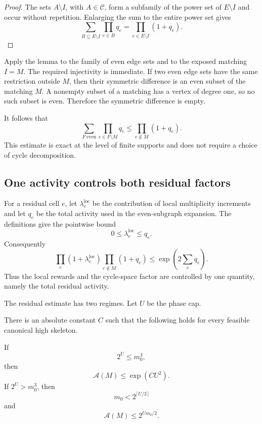 \begin{proof}
The sets $A\setminus I$, with $A\in\mathcal C$, form a subfamily of the power
set of $E\setminus I$ and occur without repetition.  Enlarging the sum to the
entire power set gives
\[
  \sum_{B\subseteq E\setminus I}\prod_{e\in B}q_e
  =
  \prod_{e\in E\setminus I}(1+q_e).
\]
\end{proof}

Apply the lemma to the family of even edge sets and to the exposed matching
$I=M$.  The required injectivity is immediate.  If two even edge sets have the
same restriction outside $M$, then their symmetric difference is an even
subset of the matching $M$.  A nonempty subset of a matching has a vertex of
degree one, so no such subset is even.  Therefore the symmetric difference is
empty.

It follows that
\begin{equation}
  \sum_{F\ \mathrm{even}}
    \prod_{e\in F\setminus M}q_e
  \le
  \prod_{e\notin M}(1+q_e).
  \label{eq:even-family-product-v2}
\end{equation}
This estimate is exact at the level of finite supports and does not require a
choice of cycle decomposition.

\subsection{One activity controls both residual factors}

For a residual cell $e$, let $\lambda_e^{\mathrm{loc}}$ be the contribution of
local multiplicity increments and let $q_e$ be the total activity used in the
even-subgraph expansion.  The definitions give the pointwise bound
\[
  0\le \lambda_e^{\mathrm{loc}}\le q_e.
\]
Consequently
\[
  \prod_e(1+\lambda_e^{\mathrm{loc}})
  \prod_{e\notin M}(1+q_e)
  \le
  \exp\!\left(2\sum_e q_e\right).
\]
Thus the local rewards and the cycle-space factor are controlled by one
quantity, namely the total residual activity.

The residual estimate has two regimes.  Let $U$ be the phase cap.

\begin{proposition}
\label{prop:q-only-attachment-v2}
There is an absolute constant $C$ such that the following holds for every
feasible canonical high skeleton.

If
\[
  2^U\le m_0^3,
\]
then
\[
  \mathcal A(M)\le \exp(CU^2).
\]
If $2^U>m_0^3$, then
\[
  m_0<2^{\lceil U/3\rceil}
\]
and
\[
  \mathcal A(M)\le 2^{Um_0/2}.
\]
\end{proposition}

